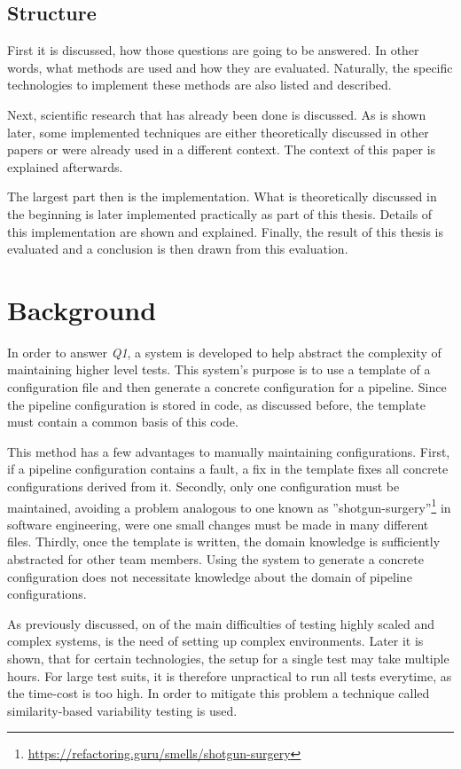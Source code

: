 \section{Structure}\label{sec:structure}

First it is discussed, how those questions are going to be answered.
In other words, what methods are used and how they are evaluated.
Naturally, the specific technologies to implement these methods are also listed and described.

Next, scientific research that has already been done is discussed.
As is shown later, some implemented techniques are either theoretically discussed in other papers or were already used in a different context.
The context of this paper is explained afterwards.

The largest part then is 
the implementation.
What is theoretically discussed in the beginning is later implemented practically as part of this thesis.
Details of this implementation are shown and explained.
Finally, the result of this thesis is evaluated and a conclusion is then drawn from this evaluation.

\chapter{Background}\label{ch:background}

In order to answer \textit{Q1}, a system is developed to help abstract the complexity of maintaining higher level tests.
This system's purpose is to use a template of a configuration file and then generate a concrete configuration for a pipeline.
Since the pipeline configuration is stored in code, as discussed before, the template must contain a common basis of this code.

This method has a few advantages to manually maintaining configurations.
First, if a pipeline configuration contains a fault, a fix in the template fixes all concrete configurations derived from it.
Secondly, only one configuration must be maintained, avoiding a problem analogous to one known as ''shotgun-surgery''\footnote{\url{https://refactoring.guru/smells/shotgun-surgery}} in software engineering, were one small changes must be made in many different files.
Thirdly, once the template is written, the domain knowledge is sufficiently abstracted for other team members.
Using the system to generate a concrete configuration does not necessitate knowledge about the domain of pipeline configurations.

As previously discussed, on of the main difficulties of testing highly scaled and complex systems, is the need of setting up complex environments.
Later it is shown, that for certain technologies, the setup for a single test may take multiple hours.
For large test suits, it is therefore unpractical to run all tests everytime, as the time-cost is too high.
In order to mitigate this problem a technique called similarity-based variability testing is used.

